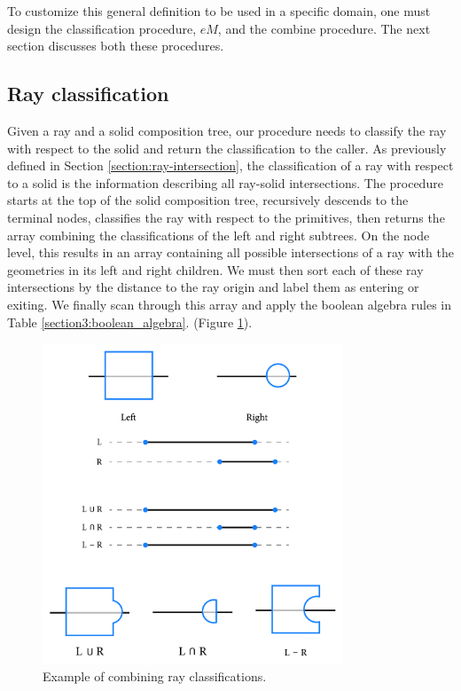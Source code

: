 \documentclass[a4paper,11pt,oneside]{article}
\begin{document}
To customize this general definition to be used in a specific domain, one must design the classification procedure, $eM$, and the combine procedure. The next section discusses both these procedures.

\subsection{Ray classification}
\label{sec3.3:ray-classification}

Given a ray and a solid composition tree, our procedure needs to classify the ray with respect to the solid and return the classification to the caller. As previously defined in Section \ref{section:ray-intersection}, the classification of a ray with respect to a solid is the information describing all ray-solid intersections. The procedure starts at the top of the solid composition tree, recursively descends to the terminal nodes, classifies the ray with respect to the primitives, then returns the array combining the classifications of the left and right subtrees. On the node level, this results in an array containing all possible intersections of a ray with the geometries in its left and right children. We must then sort each of these ray intersections by the distance to the ray origin and label them as entering or exiting. We finally scan through this array and apply the boolean algebra rules in Table \ref{section3:boolean_algebra}. (Figure \ref{sec3.3:classification}).
\begin{figure}[ht]
	\begin{center}
		\includegraphics[width=0.8\textwidth]{section3/3.3/ray-classifications.png}
	\end{center}
	\caption{Example of combining ray classifications.}
	\label{sec3.3:classification}
\end{figure}
\end{document}
